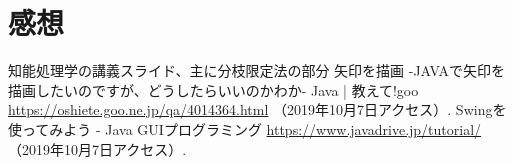 \documentclass[a4j]{jarticle}
\begin{document}
\section{感想}

\begin{thebibliography}{99}
   知能処理学の講義スライド、主に分枝限定法の部分
   矢印を描画 -JAVAで矢印を描画したいのですが、どうしたらいいのかわか- Java | 教えて!goo
  \url{https://oshiete.goo.ne.jp/qa/4014364.html} （2019年10月7日アクセス）.
   Swingを使ってみよう - Java GUIプログラミング
  \url{https://www.javadrive.jp/tutorial/} （2019年10月7日アクセス）.
\end{thebibliography}
\end{document}
